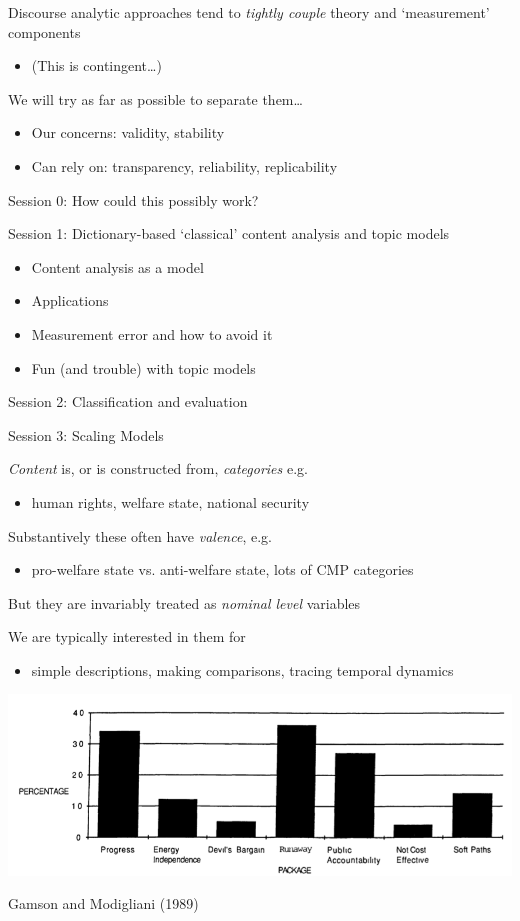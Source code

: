 \documentclass[11pt,compress,professionalfonts]{beamer}
\newcommand{\ita}{\begin{itemize}}
\newcommand{\itm}{\item[]}
\newcommand{\itz}{\end{itemize}}
\begin{document}

Discourse analytic approaches tend to \textit{tightly couple} theory and `measurement' components
\ita
\itm (This is contingent\ldots)
\itz
We will try as far as possible to separate them\ldots
\ita
\itm Our concerns: validity, stability
\itm Can rely on: transparency, reliability, replicability
\itz




Session 0: How could this possibly work?

Session 1: Dictionary-based `classical' content analysis and topic models
\ita
\itm Content analysis as a model
\itm Applications
\itm Measurement error and how to avoid it
\itm Fun (and trouble) with topic models
\itz

Session 2: Classification and evaluation

Session 3: Scaling Models

\slide{}



\textsl{Content} is, or is constructed from, \textsl{categories} e.g.
\ita
\itm human rights, welfare state, national security
\itz
Substantively these often have \textsl{valence}, e.g.
\ita
\itm pro-welfare state vs. anti-welfare state, lots of CMP categories
\itz
But they are invariably treated as \textsl{nominal level} variables

We are typically interested in them for
\ita
\itm simple descriptions, making comparisons, tracing temporal dynamics
\itz


\centerline{\includegraphics[scale=.8]{pictures/gamson-modigliani-frames-opinion}}
Gamson and Modigliani (1989)


\end{document}
